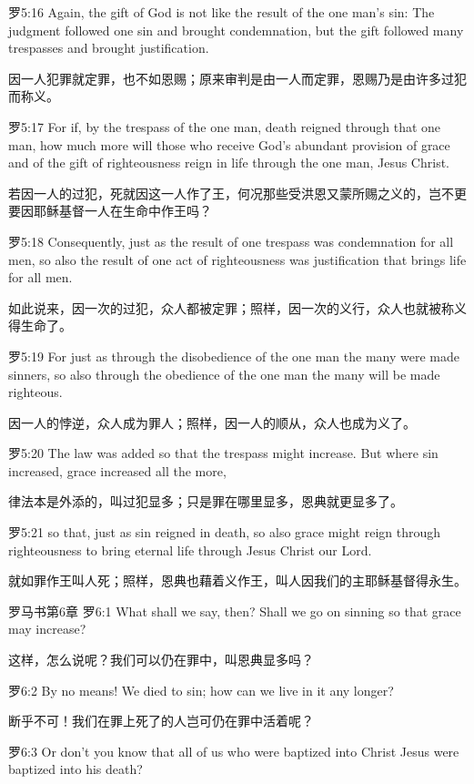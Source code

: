 \documentclass[a4paper,11pt,onecolumn,twoside]{ctexart}
\begin{document}
\begin{multicols}{2}
 罗5:16
 Again, the gift of God is not like the result of the one man's sin: The judgment followed one sin and brought condemnation, but the gift followed many trespasses and brought justification.

 因一人犯罪就定罪，也不如恩赐；原来审判是由一人而定罪，恩赐乃是由许多过犯而称义。


 罗5:17
 For if, by the trespass of the one man, death reigned through that one man, how much more will those who receive God's abundant provision of grace and of the gift of righteousness reign in life through the one man, Jesus Christ.

 若因一人的过犯，死就因这一人作了王，何况那些受洪恩又蒙所赐之义的，岂不更要因耶稣基督一人在生命中作王吗？


 罗5:18
 Consequently, just as the result of one trespass was condemnation for all men, so also the result of one act of righteousness was justification that brings life for all men.

 如此说来，因一次的过犯，众人都被定罪；照样，因一次的义行，众人也就被称义得生命了。


 罗5:19
 For just as through the disobedience of the one man the many were made sinners, so also through the obedience of the one man the many will be made righteous.

 因一人的悖逆，众人成为罪人；照样，因一人的顺从，众人也成为义了。


 罗5:20
 The law was added so that the trespass might increase. But where sin increased, grace increased all the more,

 律法本是外添的，叫过犯显多；只是罪在哪里显多，恩典就更显多了。


 罗5:21
 so that, just as sin reigned in death, so also grace might reign through righteousness to bring eternal life through Jesus Christ our Lord.

 就如罪作王叫人死；照样，恩典也藉着义作王，叫人因我们的主耶稣基督得永生。


 罗马书第6章
 罗6:1
 What shall we say, then? Shall we go on sinning so that grace may increase?

 这样，怎么说呢？我们可以仍在罪中，叫恩典显多吗？


 罗6:2
 By no means! We died to sin; how can we live in it any longer?

 断乎不可！我们在罪上死了的人岂可仍在罪中活着呢？


 罗6:3
 Or don't you know that all of us who were baptized into Christ Jesus were baptized into his death?


\end{multicols}
\end{document}
